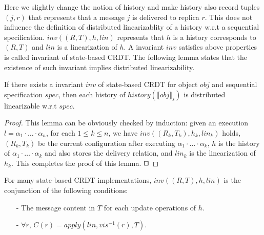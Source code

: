 Here we slightly change the notion of history and make history also record tuples $(j,r)$ that represents that a message $j$ is delivered to replica $r$. This does not influence the definition of distributed linearizablity of a history w.r.t a sequential specification. $\mathit{inv}((R, T),h,\mathit{lin})$ represents that $h$ is a history corresponds to $(R,T)$ and $\mathit{lin}$ is a linearization of $h$. A invariant $\mathit{inv}$ satisfies above properties is called invariant of state-based CRDT. The following lemma states that the existence of such invariant implies distributed linearizability.


\begin{lemma}
\label{lemma:invariant of state-based CRDT implies distributed linearizability}
If there exists a invariant $\mathit{inv}$ of state-based CRDT for object $\mathit{obj}$ and sequential specification $\mathit{spec}$, then each history of $\mathit{history}(\llbracket \mathit{obj} \rrbracket_s)$ is distributed linearizable w.r.t $\mathit{spec}$.
\end{lemma}

\begin {proof}
This lemma can be obviously checked by induction: given an execution $l=\alpha_1 \cdot \ldots \cdot \alpha_n$, for each $1 \leq k \leq n$, we have $\mathit{inv}((R_k,T_k),h_k,\mathit{lin}_k)$ holds, $(R_k,T_k)$ be the current configuration after executing $\alpha_1 \cdot \ldots \cdot \alpha_k$, $h$ is the history of $\alpha_1 \cdot \ldots \cdot \alpha_k$ and also stores the delivery relation, and $\mathit{lin}_k$ is the linearization of $h_k$. This completes the proof of this lemma. $\qed$
\end {proof}




For many state-based CRDT implementations, $\mathit{inv}((R, T), h, \mathit{lin})$ is the conjunction of the following conditions:

\begin{itemize}
\setlength{\itemsep}{0.5pt}
\item[-] The message content in $T$ for each update operations of $h$.

\item[-] $\forall r$, $C(r) = \mathit{apply}(\mathit{lin},\mathit{vis}^{-1}(r),T)$.
\end{itemize}

